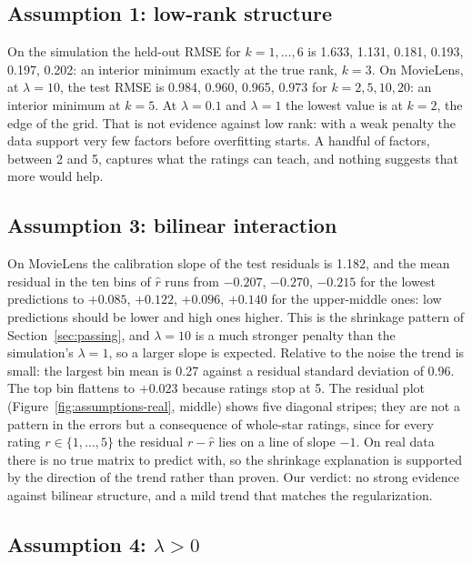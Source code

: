 \documentclass[11pt]{article}
\theoremstyle{definition}
\begin{document}
\subsection{Assumption 1: low-rank structure}

On the simulation the held-out RMSE for $k = 1, \dots, 6$ is 1.633, 1.131, 0.181, 0.193, 0.197,
0.202: an interior minimum exactly at the true rank, $k = 3$. On MovieLens, at $\lambda = 10$, the
test RMSE is 0.984, 0.960, 0.965, 0.973 for $k = 2, 5, 10, 20$: an interior minimum at $k = 5$. At
$\lambda = 0.1$ and $\lambda = 1$ the lowest value is at $k = 2$, the edge of the grid. That is not
evidence against low rank: with a weak penalty the data support very few factors before
overfitting starts. A handful of factors, between 2 and 5, captures what the ratings can teach,
and nothing suggests that more would help.

\subsection{Assumption 3: bilinear interaction}

On MovieLens the calibration slope of the test residuals is 1.182, and the mean residual in the ten
bins of $\hat r$ runs from $-0.207$, $-0.270$, $-0.215$ for the lowest predictions to $+0.085$,
$+0.122$, $+0.096$, $+0.140$ for the upper-middle ones: low predictions should be lower and high
ones higher. This is the shrinkage pattern of Section~\ref{sec:passing}, and $\lambda = 10$ is a
much stronger penalty than the simulation's $\lambda = 1$, so a larger slope is expected. Relative
to the noise the trend is small: the largest bin mean is 0.27 against a residual standard deviation
of 0.96. The top bin flattens to $+0.023$ because ratings stop at 5. The residual plot
(Figure~\ref{fig:assumptions-real}, middle) shows five diagonal stripes; they are not a pattern in
the errors but a consequence of whole-star ratings, since for every rating $r \in \{1,\dots,5\}$ the
residual $r - \hat r$ lies on a line of slope $-1$. On real data there is no true matrix to predict
with, so the shrinkage explanation is supported by the direction of the trend rather than proven.
Our verdict: no strong evidence against bilinear structure, and a mild trend that matches the
regularization.

\subsection{\texorpdfstring{Assumption 4: $\lambda > 0$}{Assumption 4: lambda > 0}}
\label{sec:a4}
\end{document}
